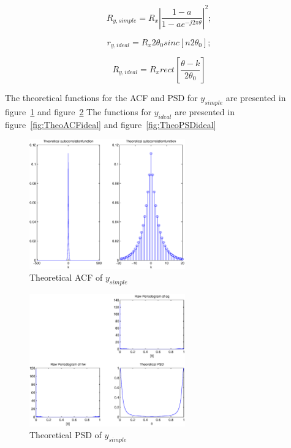 \documentclass[10pt]{article}
\begin{document}
\begin{equation}
  \label{eq:PSDsimple}
  R_{y,simple} =  R_x|\frac{1-a}{1-ae^{-j2\pi\theta}}|^2;
\end{equation}

\begin{equation}
  \label{eq:ACFideal}
  r_{y,ideal} = R_x2\theta_{0}sinc[n2\theta_0];
\end{equation}

\begin{equation}
  \label{eq:PSDideal}
  R_{y,ideal} = R_xrect[\frac{\theta - k}{2\theta_0}]
\end{equation}


The theoretical functions for the ACF and PSD for $y_{simple}$ are presented
in figure~\ref{fig:TheoACFsimple} and figure~\ref{fig:TheoPSDsimple}
The functions for $y_{ideal}$ are presented in figure~\ref{fig:TheoACFideal} and
figure~\ref{fig:TheoPSDideal}



\begin{figure}[!hp]

    \begin{center}
      \includegraphics[width=0.6\textwidth]{TheoACF}
    \caption{Theoretical ACF of $y_{simple}$ \label{fig:TheoACFsimple}}
    \end{center}

\end{figure}

\begin{figure}[!hp]

    \begin{center}
      \includegraphics[width=0.6\textwidth]{TheoPSD}
    \caption{Theoretical PSD of $y_{simple}$ \label{fig:TheoPSDsimple}}
    \end{center}

\end{figure}
\end{document}
